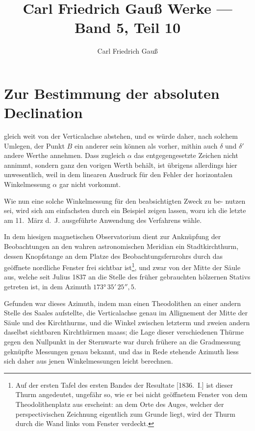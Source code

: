 \documentclass[12pt,a4paper]{article}
\title{Carl Friedrich Gauß Werke --- Band 5, Teil 10}
\author{Carl Friedrich Gauß}
\date{}
\begin{document}
\maketitle
\thispagestyle{empty}

\setlength{\parindent}{1em}
\setlength{\parskip}{0.5ex}

\section*{Zur Bestimmung der absoluten Declination}

gleich weit von der Verticalachse abstehen, und es würde daher, nach solchem
Umlegen, der Punkt $B$ ein anderer sein können als vorher, mithin auch $\delta$ und $\delta'$
andere Werthe annehmen. Dass zugleich $\alpha$ das entgegengesetzte Zeichen nicht
annimmt, sondern ganz den vorigen Werth behält, ist übrigens allerdings hier
unwesentlich, weil in dem linearen Ausdruck für den Fehler der horizontalen
Winkelmessung $\alpha$ gar nicht vorkommt.

Wie nun eine solche Winkelmessung für den beabsichtigten Zweck zu be-
nutzen sei, wird sich am einfachsten durch ein Beispiel zeigen lassen, wozu ich
die letzte am 11.~März d.~J. ausgeführte Anwendung des Verfahrens wähle.

In dem hiesigen magnetischen Observatorium dient zur Anknüpfung der
Beobachtungen an den wahren astronomischen Meridian ein Stadtkirchthurm,
dessen Knopfstange an dem Platze des Beobachtungsfernrohrs durch das geöffnete
nordliche Fenster frei sichtbar ist\footnote{Auf der ersten Tafel des ersten Bandes der Resultate [1836.~I.] ist dieser Thurm angedeutet, ungefähr so, wie er bei nicht geöffnetem Fenster von dem Theodolithenplatz aus erscheint: an dem Orte des Auges, welcher der perspectivischen Zeichnung eigentlich zum Grunde liegt, wird der Thurm durch die Wand links vom Fenster verdeckt.}, und zwar von der Mitte der Säule aus,
welche seit Julius 1837 an die Stelle des früher gebrauchten hölzernen Stativs
getreten ist, in dem Azimuth $173°\,35'\,25''{,}5$.

Gefunden war dieses Azimuth, indem man einen Theodolithen an einer andern Stelle des Saales aufstellte, die Verticalachse genau im Allignement der Mitte der Säule und des Kirchthurms, und die Winkel zwischen letzterm und zweien andern daselbst sichtbaren Kirchthürmen maass; die Lage dieser verschiedenen Thürme gegen den Nullpunkt in der Sternwarte war durch frühere an die Gradmessung geknüpfte Messungen genau bekannt, und das in Rede stehende Azimuth liess sich daher aus jenen Winkelmessungen leicht berechnen.
\end{document}
